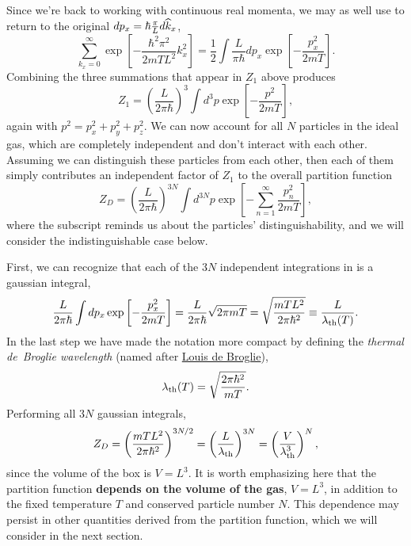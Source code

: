 Since we're back to working with continuous real momenta, we may as well use  to return to the original $dp_x = \hbar \frac{\pi}{L} d\widehat k_x$,
\begin{equation*}
  \sum_{k_x = 0}^{\infty} \exp\left[-\frac{\hbar^2 \pi^2}{2mTL^2} k_x^2\right] = \frac{1}{2} \int \frac{L}{\pi\hbar} dp_x \exp\left[-\frac{p_x^2}{2mT}\right].
\end{equation*}
Combining the three summations that appear in $Z_1$ above produces
\begin{equation*}
  Z_1 = \left(\frac{L}{2\pi\hbar}\right)^3 \int d^3p \exp\left[-\frac{p^2}{2mT}\right],
\end{equation*}
again with $p^2 = p_x^2 + p_y^2 + p_z^2$.
We can now account for all $N$ particles in the ideal gas, which are completely independent and don't interact with each other.
Assuming we can distinguish these particles from each other, then each of them simply contributes an independent factor of $Z_1$ to the overall partition function
\begin{equation}
  \label{eq:ideal_dist_int}
  Z_D = \left(\frac{L}{2\pi\hbar}\right)^{3N} \int d^{3N}p \exp\left[-\sum_{n = 1}^{\infty} \frac{p_n^2}{2mT}\right],
\end{equation}
where the subscript reminds us about the particles' distinguishability, and we will consider the indistinguishable case below.

First, we can recognize that each of the $3N$ independent integrations in  is a gaussian integral,
\begin{equation*}
  \frac{L}{2\pi\hbar} \int dp_x \exp\left[-\frac{p_x^2}{2mT}\right] = \frac{L}{2\pi\hbar} \sqrt{2\pi mT} = \sqrt{\frac{mTL^2}{2\pi\hbar^2}} \equiv \frac{L}{\lambda_{\mathrm{th}}(T)}.
\end{equation*}
In the last step we have made the notation more compact by defining the \textit{thermal de~Broglie wavelength} (named after \href{https://en.wikipedia.org/wiki/Louis_de_Broglie}{Louis de Broglie}),
\begin{equation}
  \lambda_{\mathrm{th}}(T) = \sqrt{\frac{2\pi\hbar^2}{mT}}.
\end{equation}
Performing all $3N$ gaussian integrals,
\begin{equation}
  \label{eq:ideal_dist}
  Z_D = \left(\frac{mTL^2}{2\pi\hbar^2}\right)^{3N / 2} = \left(\frac{L}{\lambda_{\mathrm{th}}}\right)^{3N} = \left(\frac{V}{\lambda_{\mathrm{th}}^3}\right)^N,
\end{equation}
since the volume of the box is $V = L^3$.
It is worth emphasizing here that the partition function \textbf{depends on the volume of the gas}, $V = L^3$, in addition to the fixed temperature $T$ and conserved particle number $N$.
This dependence may persist in other quantities derived from the partition function, which we will consider in the next section.

